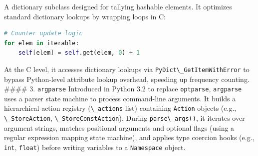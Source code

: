 A dictionary subclass designed for tallying hashable elements. It
optimizes standard dictionary lookups by wrapping loops in C:

\begin{lstlisting}[language=Python]
# Counter update logic
for elem in iterable:
    self[elem] = self.get(elem, 0) + 1
\end{lstlisting}

At the C level, it accesses dictionary lookups via
\passthrough{\lstinline!PyDict\_GetItemWithError!} to bypass
Python-level attribute lookup overhead, speeding up frequency counting.
\#\#\#\# 3. \passthrough{\lstinline!argparse!} Introduced in Python 3.2
to replace \passthrough{\lstinline!optparse!},
\passthrough{\lstinline!argparse!} uses a parser state machine to
process command-line arguments. It builds a hierarchical action registry
(\passthrough{\lstinline!\_actions!} list) containing
\passthrough{\lstinline!Action!} objects (e.g.,
\passthrough{\lstinline!\_StoreAction!},
\passthrough{\lstinline!\_StoreConstAction!}). During
\passthrough{\lstinline!parse\_args()!}, it iterates over argument
strings, matches positional arguments and optional flags (using a
regular expression mapping state machine), and applies type coercion
hooks (e.g., \passthrough{\lstinline!int!},
\passthrough{\lstinline!float!}) before writing variables to a
\passthrough{\lstinline!Namespace!} object.
